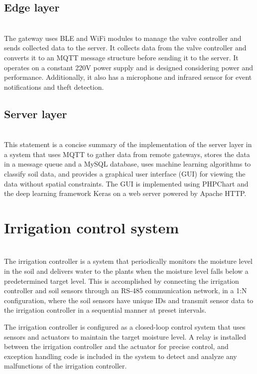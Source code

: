 \documentclass[11pt]{article}
\begin{document}
\subsection{Edge layer}
\indent \\The gateway uses BLE and WiFi modules to manage the valve controller and sends collected data to the server. It collects data from the valve controller and converts it to an MQTT message structure before sending it to the server. It operates on a constant 220V power supply and is designed considering power and performance. Additionally, it also has a microphone and infrared sensor for event notifications and theft detection.

\subsection{Server layer}
\indent \\This statement is a concise summary of the implementation of the server layer in a system that uses MQTT to gather data from remote gateways, stores the data in a message queue and a MySQL database, uses machine learning algorithms to classify soil data, and provides a graphical user interface (GUI) for viewing the data without spatial constraints. The GUI is implemented using PHPChart and the deep learning framework Keras on a web server powered by Apache HTTP.

\section{Irrigation control system}
\indent \\The irrigation controller is a system that periodically monitors the moisture level in the soil and delivers water to the plants when the moisture level falls below a predetermined target level. This is accomplished by connecting the irrigation controller and soil sensors through an RS-485 communication network, in a 1:N configuration, where the soil sensors have unique IDs and transmit sensor data to the irrigation controller in a sequential manner at preset intervals.

The irrigation controller is configured as a closed-loop control system that uses sensors and actuators to maintain the target moisture level. A relay is installed between the irrigation controller and the actuator for precise control, and exception handling code is included in the system to detect and analyze any malfunctions of the irrigation controller.
\end{document}
